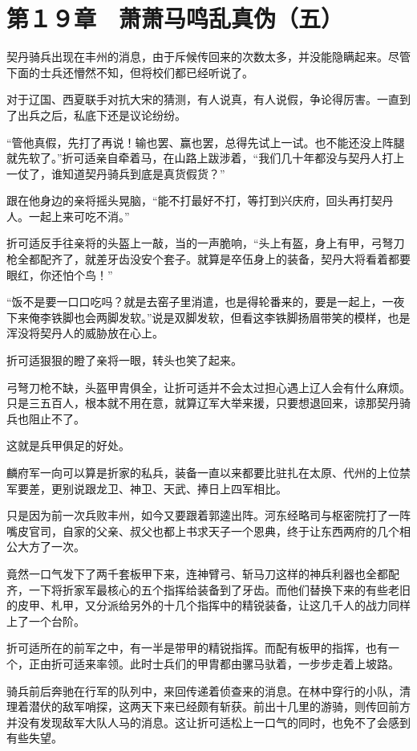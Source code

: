 \section{第１９章　萧萧马鸣乱真伪（五）}

契丹骑兵出现在丰州的消息，由于斥候传回来的次数太多，并没能隐瞒起来。尽管下面的士兵还懵然不知，但将校们都已经听说了。

对于辽国、西夏联手对抗大宋的猜测，有人说真，有人说假，争论得厉害。一直到了出兵之后，私底下还是议论纷纷。

“管他真假，先打了再说！输也罢、赢也罢，总得先试上一试。也不能还没上阵腿就先软了。”折可适亲自牵着马，在山路上跋涉着，“我们几十年都没与契丹人打上一仗了，谁知道契丹骑兵到底是真货假货？”

跟在他身边的亲将摇头晃脑，“能不打最好不打，等打到兴庆府，回头再打契丹人。一起上来可吃不消。”

折可适反手往亲将的头盔上一敲，当的一声脆响，“头上有盔，身上有甲，弓弩刀枪全都配齐了，就差牙齿没安个套子。就算是卒伍身上的装备，契丹大将看着都要眼红，你还怕个鸟！”

“饭不是要一口口吃吗？就是去窑子里消遣，也是得轮番来的，要是一起上，一夜下来俺李铁脚也会两脚发软。”说是双脚发软，但看这李铁脚扬眉带笑的模样，也是浑没将契丹人的威胁放在心上。

折可适狠狠的瞪了亲将一眼，转头也笑了起来。

弓弩刀枪不缺，头盔甲胄俱全，让折可适并不会太过担心遇上辽人会有什么麻烦。只是三五百人，根本就不用在意，就算辽军大举来援，只要想退回来，谅那契丹骑兵也阻止不了。

这就是兵甲俱足的好处。

麟府军一向可以算是折家的私兵，装备一直以来都要比驻扎在太原、代州的上位禁军要差，更别说跟龙卫、神卫、天武、捧日上四军相比。

只是因为前一次兵败丰州，如今又要跟着郭逵出阵。河东经略司与枢密院打了一阵嘴皮官司，自家的父亲、叔父也都上书求天子一个恩典，终于让东西两府的几个相公大方了一次。

竟然一口气发下了两千套板甲下来，连神臂弓、斩马刀这样的神兵利器也全都配齐，一下将折家军最核心的五个指挥给装备到了牙齿。而他们替换下来的有些老旧的皮甲、札甲，又分派给另外的十几个指挥中的精锐装备，让这几千人的战力同样上了一个台阶。

折可适所在的前军之中，有一半是带甲的精锐指挥。而配有板甲的指挥，也有一个，正由折可适来率领。此时士兵们的甲胄都由骡马驮着，一步步走着上坡路。

骑兵前后奔驰在行军的队列中，来回传递着侦查来的消息。在林中穿行的小队，清理着潜伏的敌军哨探，这两天下来已经颇有斩获。前出十几里的游骑，则传回前方并没有发现敌军大队人马的消息。这让折可适松上一口气的同时，也免不了会感到有些失望。

